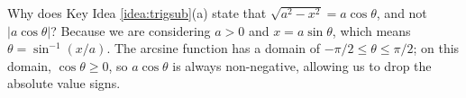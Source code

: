 {Why does Key Idea \ref{idea:trigsub}(a) state that $\sqrt{a^2-x^2} = a\cos\theta$, and not $|a\cos\theta|$?
}
{Because we are considering $a>0$ and $x=a\sin \theta$, which means $\theta = \sin^{-1}(x/a)$. The arcsine function has a domain of $-\pi/2\leq \theta \leq \pi/2$; on this domain, $\cos \theta \geq 0$, so $a\cos\theta$ is always non-negative, allowing us to drop the absolute value signs.
}